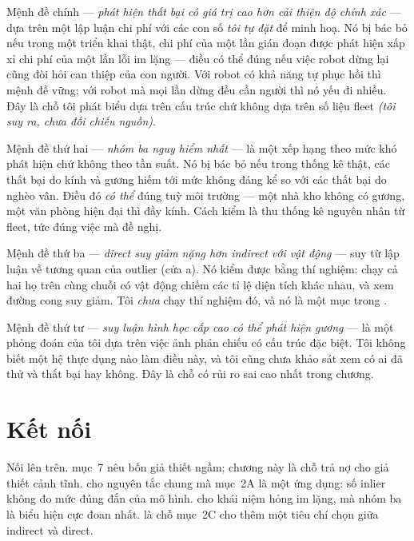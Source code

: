 \documentclass[../../vslam.tex]{subfiles}
\begin{document}
Mệnh đề chính --- \emph{phát hiện thất bại có giá trị cao hơn cải thiện độ chính xác} --- dựa trên một lập luận chi phí với các con số \emph{tôi tự đặt} để minh hoạ. Nó bị bác bỏ nếu trong một triển khai thật, chi phí của một lần gián đoạn được phát hiện xấp xỉ chi phí của một lần lỗi im lặng --- điều có thể đúng nếu việc robot dừng lại cũng đòi hỏi can thiệp của con người. Với robot có khả năng tự phục hồi thì mệnh đề vững; với robot mà mọi lần dừng đều cần người thì nó yếu đi nhiều. Đây là chỗ tôi phát biểu dựa trên cấu trúc chứ không dựa trên số liệu fleet \emph{(tôi suy ra, chưa đối chiếu nguồn)}.

Mệnh đề thứ hai --- \emph{nhóm ba nguy hiểm nhất} --- là một xếp hạng theo mức khó phát hiện chứ không theo tần suất. Nó bị bác bỏ nếu trong thống kê thật, các thất bại do kính và gương hiếm tới mức không đáng kể so với các thất bại do nghèo vân. Điều đó \emph{có thể} đúng tuỳ môi trường --- một nhà kho không có gương, một văn phòng hiện đại thì đầy kính. Cách kiểm là thu thống kê nguyên nhân từ fleet, tức đúng việc mà  đề nghị.

Mệnh đề thứ ba --- \emph{direct suy giảm nặng hơn indirect với vật động} --- suy từ lập luận về tương quan của outlier (cửa a). Nó kiểm được bằng thí nghiệm: chạy cả hai họ trên cùng chuỗi có vật động chiếm các tỉ lệ diện tích khác nhau, và xem đường cong suy giảm. Tôi \emph{chưa} chạy thí nghiệm đó, và nó là một mục trong .

Mệnh đề thứ tư --- \emph{suy luận hình học cấp cao có thể phát hiện gương} --- là một phỏng đoán của tôi dựa trên việc ảnh phản chiếu có cấu trúc đặc biệt. Tôi không biết một hệ thực dụng nào làm điều này, và tôi cũng chưa khảo sát xem có ai đã thử và thất bại hay không. Đây là chỗ có rủi ro sai cao nhất trong chương.

\section{Kết nối}

Nối lên trên.  mục~7 nêu bốn giả thiết ngầm; chương này là chỗ trả nợ cho giả thiết cảnh tĩnh.  cho nguyên tắc chung mà mục~2A là một ứng dụng: số inlier không đo mức đúng đắn của mô hình.  cho khái niệm hỏng im lặng, mà nhóm ba là biểu hiện cực đoan nhất.  là chỗ mục~2C cho thêm một tiêu chí chọn giữa indirect và direct.
\end{document}
